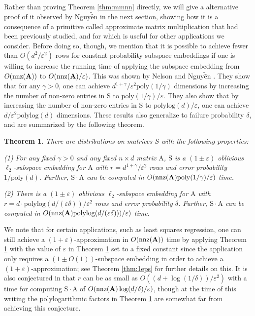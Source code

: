 \documentclass[11pt]{article}
\newtheorem{theorem}{Theorem}
\newcommand{\mat}[1]{{\ensuremath{\bm{\mathrm{#1}}}}}
\def\matA{\mat{A}}
\def\matS{\mat{S}}
\def\nnz{{ \rm nnz }}
\newcommand{\eps}{\varepsilon}
\newcommand{\poly}{{\mathrm{poly}}}
\newcommand{\polylog}{{\mathrm{polylog}}}
\begin{document}
Rather than proving Theorem \ref{thm:mmnn} directly, we will give a 
alternative proof of it observed by Nguy$\tilde{\hat{\mbox{e}}}$n \cite{n13}
in the next section, showing how it is a consequence of a primitive called approximate matrix multiplication that
had been previously studied, and for which is useful for other applications we consider. 
Before doing so, though, we mention that it is possible to achieve fewer than $O(d^2/\eps^2)$ rows for constant
probability subspace embeddings 
if one is willing to increase the running time of applying the subspace embedding from 
$O(\nnz(\matA))$ to $O(\nnz(\matA)/\eps)$. 
This was shown by Nelson
and Nguy$\tilde{\hat{\mbox{e}}}$n \cite{JH13}. 
They show that for any $\gamma > 0$, one can achieve $d^{1+\gamma}/\eps^2 \poly(1/\gamma)$ dimensions
by increasing the number of non-zero entries in $\matS$ to $\poly(1/\gamma)/\eps$. They also show that 
by increasing the number of non-zero entries in $\matS$ to $\polylog(d)/\eps$, 
one can achieve $d/\eps^2 \polylog(d)$ dimensions. These results also generalize to failure probability $\delta$,
and are summarized by the following theorem. 

\begin{theorem}\label{thm:nn}\cite{JH13}
There are distributions on matrices $S$ with the following properties:

(1) For any fixed $\gamma > 0$ and any fixed $n \times d$ matrix $\matA$, 
$\matS$ is a $(1 \pm \eps)$ oblivious $\ell_2$-subspace embedding for $\matA$
with $r = d^{1+\gamma}/\eps^2$ rows and error probability $1/\poly(d)$. Further, $\matS \cdot \matA$ can be computed
in $O(\nnz(\matA) \poly(1/\gamma)/\eps )$ time. 

(2) There is a $(1 \pm \eps)$ oblivious $\ell_2$-subspace embedding for $\matA$ 
with $r = d \cdot \polylog(d/(\eps \delta))/\eps^2$ rows and error probability $\delta$. 
Further, $\matS \cdot \matA$ can be computed
in $O(\nnz(\matA) \polylog(d/(\eps \delta)))/\eps)$ time. 
\end{theorem}
We note that for certain applications, such as least squares regression, one can
still achieve a $(1+\eps)$-approximation in $O(\nnz(\matA))$ time by applying Theorem \ref{thm:nn}
with the value of $\eps$ in Theorem \ref{thm:nn} set to a fixed constant since the application only
requires a $(1 \pm O(1))$-subspace embedding in order to achieve a $(1+\eps)$-approximation; see 
Theorem \ref{thm:1eps} for further details on this. It is also conjectured in \cite{JH13} that
$r$ can be as small as $O((d+\log(1/\delta))/\eps^2)$ with a time for computing $\matS \cdot \matA$
of $O(\nnz(\matA) \log(d/\delta)/\eps)$, though at the time of this writing the polylogarithmic
factors in Theorem \ref{thm:nn} are somewhat far from achieving this conjecture. 
\end{document}
